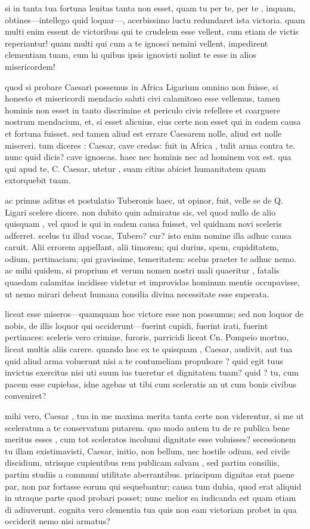  si in tanta tua fortuna lenitas tanta non esset, quam tu per te, per te , inquam, obtines—intellego quid loquar—, acerbissimo luctu redundaret ista victoria. quam multi enim essent de victoribus qui te crudelem esse vellent, cum etiam de victis reperiantur! quam multi qui cum a te ignosci nemini vellent, impedirent clementiam tuam, cum hi quibus ipsis ignovisti nolint te esse in alios misericordem!

 quod si probare Caesari possemus in Africa Ligarium omnino non fuisse, si honesto et misericordi mendacio saluti civi calamitoso esse vellemus, tamen hominis non esset in tanto discrimine et periculo civis refellere et coarguere nostrum mendacium, et, si esset alicuius, eius certe non esset qui in eadem causa et fortuna fuisset. sed tamen aliud est errare Caesarem nolle, aliud est nolle misereri. tum diceres : Caesar, cave credas: fuit in Africa , tulit arma contra te. nunc quid dicis? cave ignoscas. haec nec hominis nec ad hominem vox est. qua qui apud te, C. Caesar, utetur , suam citius abiciet humanitatem quam extorquebit tuam.

 ac primus aditus et postulatio Tuberonis haec, ut opinor, fuit, velle se de Q. Ligari scelere dicere. non dubito quin admiratus sis, vel quod nullo de alio quisquam , vel quod is qui in eadem causa fuisset, vel quidnam novi sceleris adferret. scelus tu illud vocas, Tubero? cur? isto enim nomine illa adhuc causa caruit. Alii errorem appellant, alii timorem; qui durius, spem, cupiditatem, odium, pertinaciam; qui gravissime, temeritatem: scelus praeter te adhuc nemo. ac mihi quidem, si proprium et verum nomen nostri mali quaeritur , fatalis quaedam calamitas incidisse videtur et improvidas hominum mentis occupavisse, ut nemo mirari debeat humana consilia divina necessitate esse superata.

 liceat esse miseros—quamquam hoc victore esse non possumus; sed non loquor de nobis, de illis loquor qui occiderunt—fuerint cupidi, fuerint irati, fuerint pertinaces: sceleris vero crimine, furoris, parricidi liceat Cn. Pompeio mortuo, liceat multis aliis carere. quando hoc ex te quisquam , Caesar, audivit, aut tua quid aliud arma voluerunt nisi a te contumeliam propulsare ? quid egit tuus invictus exercitus nisi uti suum ius tueretur et dignitatem tuam? quid ? tu, cum pacem esse cupiebas, idne agebas ut tibi cum sceleratis an ut cum bonis civibus conveniret?

 mihi vero, Caesar , tua in me maxima merita tanta certe non viderentur, si me ut sceleratum a te conservatum putarem. quo modo autem tu de re publica bene meritus esses , cum tot sceleratos incolumi dignitate esse voluisses? secessionem tu illam existimavisti, Caesar, initio, non bellum, nec hostile odium, sed civile discidium, utrisque cupientibus rem publicam salvam , sed partim consiliis, partim studiis a communi utilitate aberrantibus. principum dignitas erat paene par, non par fortasse eorum qui sequebantur; causa tum dubia, quod erat aliquid in utraque parte quod probari posset; nunc melior ea iudicanda est quam etiam di adiuverunt. cognita vero clementia tua quis non eam victoriam probet in qua occiderit nemo nisi armatus?

